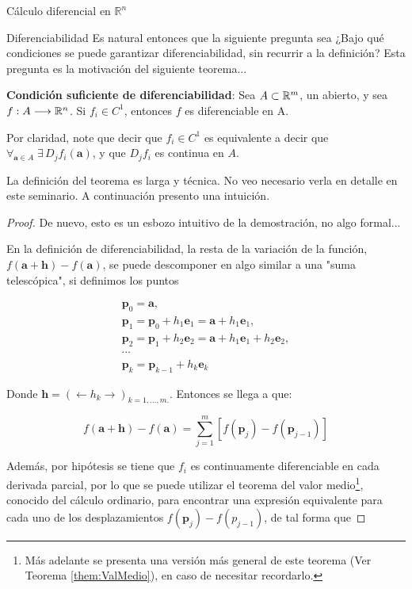 \begin{chapter}{Cálculo diferencial en $\mathbb{R}^n$}
\begin{section}{Diferenciabilidad}
Es natural entonces que la siguiente pregunta sea ¿Bajo qué condiciones se puede garantizar diferenciabilidad, sin recurrir a la definición? Esta pregunta es la motivación del siguiente teorema...

\begin{them}
\textbf{Condición suficiente de diferenciabilidad}: Sea $A \subset \mathbb{R}^m$, un abierto, y sea $f: A \longrightarrow\mathbb{R}^n$. Si $f_i \in C^1$, entonces $f$ es diferenciable en A.

Por claridad, note que decir que $f_i \in C^1$ es equivalente a decir que $\forall_{\textbf{a}\in A} \; \exists \, D_jf_i(\textbf{a})$, y que $D_jf_i$ es continua en $A$.

La definición del teorema es larga y técnica. No veo necesario verla en detalle en este seminario. A continuación presento una intuición.
\end{them}

\begin{proof}
De nuevo, esto es un esbozo intuitivo de la demostración, no algo formal...

En la definición de diferenciabilidad, la resta de la variación de la función, $f(\textbf{a}+\textbf{h}) - f(\textbf{a})$, se puede descomponer en algo similar a una "suma telescópica", si definimos los puntos

\begin{equation*}
    \begin{array}{l}
         \textbf{p}_0 = \textbf{a}, \\
         \textbf{p}_1 = \textbf{p}_0 + h_1 \textbf{e}_1 = \textbf{a} + h_1 \textbf{e}_1, \\
         \textbf{p}_2 = \textbf{p}_1 + h_2 \textbf{e}_2 = \textbf{a} + h_1 \textbf{e}_1+ h_2 \textbf{e}_2, \\
         \cdots \\
         \textbf{p}_{k} = \textbf{p}_{k-1} + h_{k} \textbf{e}_{k}
    \end{array}
\end{equation*}

Donde $\textbf{h}=(\leftarrow h_k \rightarrow)_{k=1,...,m.}$. Entonces se llega a que:

\begin{equation*}
    f(\textbf{a}+\textbf{h}) - f(\textbf{a}) = \sum_{j=1}^{m} [f(\textbf{p}_j) - f(\textbf{p}_{j-1})]
\end{equation*}

Además, por hipótesis se tiene que $f_i$ es continuamente diferenciable en cada derivada parcial, por lo que se puede utilizar el teorema del valor medio\footnote{Más adelante se presenta una versión más general de este teorema (Ver Teorema \ref{them:ValMedio}), en caso de necesitar recordarlo.}, conocido del cálculo ordinario, para encontrar una expresión equivalente para cada uno de los desplazamientos $f(\textbf{p}_j) - f(p_{j-1})$, de tal forma que


\end{proof}
\end{section}
\end{chapter}

